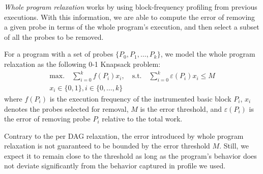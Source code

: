 \textit{Whole program relaxation} works by using block-frequency profiling from previous executions. With this information, we are able to
compute the error of removing a given probe in terms of the whole program's execution, and then select a subset of all the probes to be
removed.

For a program with a set of probes $\{P_0, P_1, \ldots, P_k\}$, we model the whole program relaxation as the following 0-1 Knapsack
problem:
\begin{gather*}
\textrm{max.}\quad\sum_{i=0}^{k} f(P_i)x_i,\quad
\textrm{s.t.}\quad\sum_{i=0}^{k} \varepsilon(P_i)x_i \leq M \\
x_i\in\{0,1\}, i\in\{0,\ldots,k\}
\end{gather*}
where $f(P_i)$ is the execution frequency of the instrumented basic block $P_i$, $x_i$ denotes the probes selected for removal, $M$ is the
error threshold, and $\varepsilon(P_i)$ is the error of removing probe $P_i$ relative to the total work. 

Contrary to the per DAG relaxation, the error introduced by whole program relaxation is not guaranteed to be bounded by the error threshold
$M$. Still, we expect it to remain close to the threshold as long as the program's behavior does not deviate significantly from the
behavior captured in profile we used.
